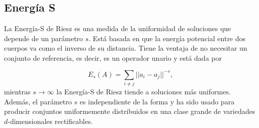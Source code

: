 


\subsection{Energía S} \label{sec:Energía-S}
La Energía-S de Riesz \cite{sEnergy} es una medida de la uniformidad de soluciones que depende de un parámetro $s$. Está basada en que la energía potencial entre dos cuerpos va como el inverso de su distancia.  Tiene la ventaja de no necesitar un conjunto de referencia, es decir, es un operador unario y está dada por 

\begin{equation} \label{eq:S_energy}
    E_s(A)=\sum_{i\neq j} ||a_i-a_j||^{-s},
\end{equation}
mientras $s\rightarrow \infty$ la Energía-S de Riesz tiende a soluciones más uniformes. Además, el parámetro $s$ es independiente de la forma y ha sido usado para producir conjuntos uniformemente distribuidos en una clase grande de variedades $d$-dimensionales rectificables.

